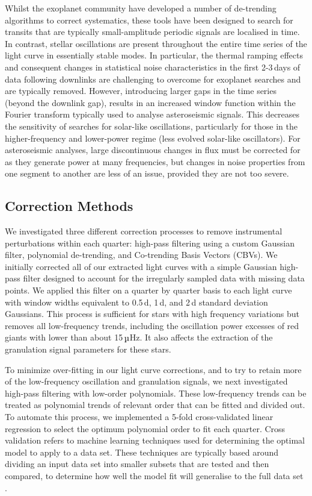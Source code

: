 Whilst the exoplanet community have developed a number of de-trending algorithms to correct \Kepler{} systematics, these tools have been designed to search for transits that are typically small-amplitude periodic signals are localised in time. In contrast, stellar oscillations are present throughout the entire time series of the light curve in essentially stable modes. In particular, the thermal ramping effects and consequent changes in statistical noise characteristics in the first 2-3\,days of data following downlinks are challenging to overcome for exoplanet searches and are typically removed. However, introducing larger gaps in the time series (beyond the downlink gap), results in an increased window function within the Fourier transform typically used to analyse asteroseismic signals. This decreases the sensitivity of searches for solar-like oscillations, particularly for those in the higher-frequency and lower-power regime (less evolved solar-like oscillators). For asteroseismic analyses, large discontinuous changes in flux must be corrected for as they generate power at many frequencies, but changes in noise properties from one segment to another are less of an issue, provided they are not too severe.

\subsection{Correction Methods}

We investigated three different correction processes to remove instrumental perturbations within each quarter: high-pass filtering using a custom Gaussian filter, polynomial de-trending, and Co-trending Basis Vectors (CBVs). We initially corrected all of our extracted light curves with a simple Gaussian high-pass filter designed to account for the irregularly sampled data with missing data points. We applied this filter on a quarter by quarter basis to each light curve with window widths equivalent to 0.5\,d, 1\,d, and 2\,d standard deviation Gaussians. This process is sufficient for stars with high frequency variations but removes all low-frequency trends, including the oscillation power excesses of red giants with \numax{} lower than about 15\,$\micro$Hz. It also affects the extraction of the granulation signal parameters for these stars.

To minimize over-fitting in our light curve corrections, and to try to retain more of the low-frequency oscillation and granulation signals, we next investigated high-pass filtering with low-order polynomials. These low-frequency trends can be treated as polynomial trends of relevant order that can be fitted and divided out. To automate this process, we implemented a 5-fold cross-validated linear regression to select the optimum polynomial order to fit each quarter. Cross validation refers to machine learning techniques used for determining the optimal model to apply to a data set. These techniques are typically based around dividing an input data set into smaller subsets that are tested and then compared, to determine how well the model fit will generalise to the full data set \citep{mosteller1965data}.

